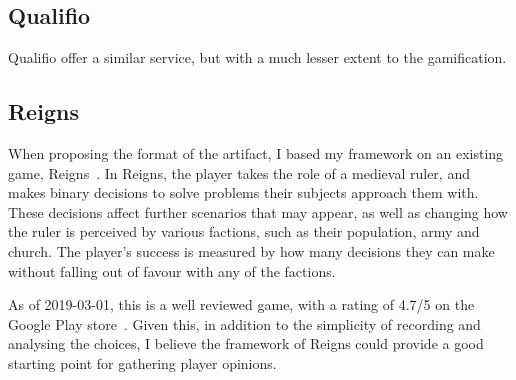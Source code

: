 \subsection{Qualifio}
Qualifio\cite{Qualifio} offer a similar service, but with a much lesser extent to the gamification.




\subsection{Reigns}
When proposing the format of the artifact, I based my framework on an existing game, Reigns~\cite{Reigns}. 
In Reigns, the player takes the role of a medieval ruler, and makes binary decisions to solve problems their subjects approach them with. 
These decisions affect further scenarios that may appear, as well as changing how the ruler is perceived by various factions, such as their population, army and church. 
The player's success is measured by how many decisions they can make without falling out of favour with any of the factions.

As of 2019-03-01, this is a well reviewed game, with a rating of 4.7/5 on the Google Play store~\cite{GooglePlay}. 
Given this, in addition to the simplicity of recording and analysing the choices, I believe the framework of Reigns could provide a good starting point for gathering player opinions. 
